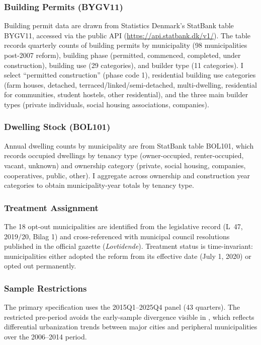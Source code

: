 \documentclass[12pt]{article}
\begin{document}
\subsubsection*{Building Permits (BYGV11)} Building permit data are drawn from Statistics Denmark's StatBank table BYGV11, accessed via the public API (\url{https://api.statbank.dk/v1/}). The table records quarterly counts of building permits by municipality (98 municipalities post-2007 reform), building phase (permitted, commenced, completed, under construction), building use (29 categories), and builder type (11 categories). I select ``permitted construction'' (phase code 1), residential building use categories (farm houses, detached, terraced/linked/semi-detached, multi-dwelling, residential for communities, student hostels, other residential), and the three main builder types (private individuals, social housing associations, companies).

\subsubsection*{Dwelling Stock (BOL101)} Annual dwelling counts by municipality are from StatBank table BOL101, which records occupied dwellings by tenancy type (owner-occupied, renter-occupied, vacant, unknown) and ownership category (private, social housing, companies, cooperatives, public, other). I aggregate across ownership and construction year categories to obtain municipality-year totals by tenancy type.

\subsubsection*{Treatment Assignment} The 18 opt-out municipalities are identified from the legislative record (L~47, 2019/20, Bilag 1) and cross-referenced with municipal council resolutions published in the official gazette (\emph{Lovtidende}). Treatment status is time-invariant: municipalities either adopted the reform from its effective date (July 1, 2020) or opted out permanently.

\subsubsection*{Sample Restrictions} The primary specification uses the 2015Q1--2025Q4 panel (43 quarters). The restricted pre-period avoids the early-sample divergence visible in , which reflects differential urbanization trends between major cities and peripheral municipalities over the 2006--2014 period.
\end{document}
